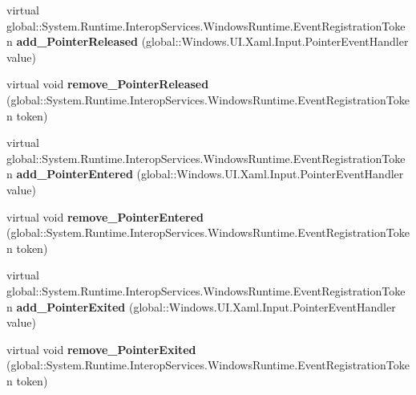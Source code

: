 \begin{DoxyCompactItemize}
\item 
\mbox{\label{class_windows_1_1_u_i_1_1_xaml_1_1_u_i_element_ac262b01e4394eafebb2fc7c72a05c364}} 
virtual global\+::\+System.\+Runtime.\+Interop\+Services.\+Windows\+Runtime.\+Event\+Registration\+Token {\bfseries add\+\_\+\+Pointer\+Released} (global\+::\+Windows.\+U\+I.\+Xaml.\+Input.\+Pointer\+Event\+Handler value)
\item 
\mbox{\label{class_windows_1_1_u_i_1_1_xaml_1_1_u_i_element_a6b1fe59db3a3dade2439c90e7005d059}} 
virtual void {\bfseries remove\+\_\+\+Pointer\+Released} (global\+::\+System.\+Runtime.\+Interop\+Services.\+Windows\+Runtime.\+Event\+Registration\+Token token)
\item 
\mbox{\label{class_windows_1_1_u_i_1_1_xaml_1_1_u_i_element_a62b58e40180ca9bf1db42ed2d6038c28}} 
virtual global\+::\+System.\+Runtime.\+Interop\+Services.\+Windows\+Runtime.\+Event\+Registration\+Token {\bfseries add\+\_\+\+Pointer\+Entered} (global\+::\+Windows.\+U\+I.\+Xaml.\+Input.\+Pointer\+Event\+Handler value)
\item 
\mbox{\label{class_windows_1_1_u_i_1_1_xaml_1_1_u_i_element_a7f81753f2c0c006e2fa7fc60206ef8fe}} 
virtual void {\bfseries remove\+\_\+\+Pointer\+Entered} (global\+::\+System.\+Runtime.\+Interop\+Services.\+Windows\+Runtime.\+Event\+Registration\+Token token)
\item 
\mbox{\label{class_windows_1_1_u_i_1_1_xaml_1_1_u_i_element_add2a4b911cb6783842ef779b81b58824}} 
virtual global\+::\+System.\+Runtime.\+Interop\+Services.\+Windows\+Runtime.\+Event\+Registration\+Token {\bfseries add\+\_\+\+Pointer\+Exited} (global\+::\+Windows.\+U\+I.\+Xaml.\+Input.\+Pointer\+Event\+Handler value)
\item 
\mbox{\label{class_windows_1_1_u_i_1_1_xaml_1_1_u_i_element_a0371add03a51f168e0d1456bdb3c1130}} 
virtual void {\bfseries remove\+\_\+\+Pointer\+Exited} (global\+::\+System.\+Runtime.\+Interop\+Services.\+Windows\+Runtime.\+Event\+Registration\+Token token)
\item 

\end{DoxyCompactItemize}
